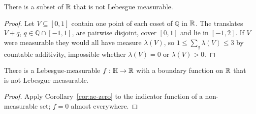 \begin{lemma}\label{fact:vitali}
There is a subset of $\mathbb{R}$ that is not Lebesgue measurable.
\end{lemma}
\begin{proof}
Let $V\subseteq[0,1]$ contain one point of each coset of $\mathbb Q$ in $\mathbb{R}$. The translates $V+q$, $q\in\mathbb Q\cap[-1,1]$, are pairwise disjoint, cover $[0,1]$ and lie in $[-1,2]$.
If $V$ were measurable they would all have measure $\lambda(V)$, so $1\le\sum_q\lambda(V)\le 3$ by countable additivity, impossible whether $\lambda(V)=0$ or $\lambda(V)>0$.
\end{proof}

\begin{corollary}\label{cor:nonmeasurable}
There is a Lebesgue-measurable $f:\mathbb{H}\to\mathbb{R}$ with a boundary function on $\mathbb{R}$ that is not Lebesgue measurable.
\end{corollary}
\begin{proof}
Apply Corollary~\ref{cor:ae-zero} to the indicator function of a non-measurable set; $f=0$ almost everywhere.
\end{proof}
